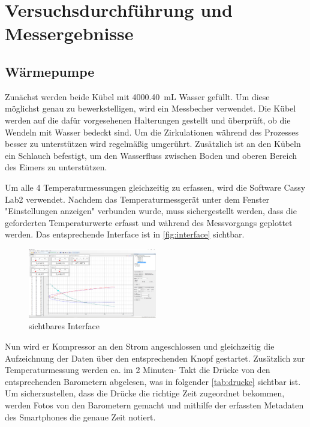 \documentclass[12pt,english,ngerman]{scrartcl}
\begin{document}
\section{Versuchsdurchführung und Messergebnisse}\label{sec:versuchsdurchfuehrung_messergebnisse}

\subsection{Wärmepumpe}

Zunächst werden beide Kübel mit \SI{4000,40}{\milli\liter} Wasser gefüllt. Um diese möglichst genau zu bewerkstelligen,
wird ein Messbecher verwendet. Die Kübel werden auf die dafür vorgesehenen Halterungen gestellt und überprüft, ob die 
Wendeln mit Wasser bedeckt sind. Um die Zirkulationen während des Prozesses besser zu unterstützen wird regelmäßig umgerührt.
Zusätzlich ist an den Kübeln ein Schlauch befestigt, um den Wasserfluss zwischen Boden und oberen Bereich des Eimers zu unterstützen.

Um alle 4 Temperaturmessungen gleichzeitig zu erfassen, wird die Software Cassy Lab2 verwendet. Nachdem das Temperaturmessgerät 
unter dem Fenster "Einstellungen anzeigen" verbunden wurde, muss sichergestellt werden, dass die geforderten Temperaturwerte
erfasst und während des Messvorgangs geplottet werden.
Das entsprechende Interface ist in \autoref{fig:interface} sichtbar.
\begin{figure}[H]
	\begin{center}
		\includegraphics[width =0.5\textwidth]{./figures/interface.PNG}
	\end{center}
	\caption{sichtbares Interface
	}\label{fig:interface}
\end{figure}

Nun wird er Kompressor an den Strom angeschlossen und gleichzeitig die Aufzeichnung der Daten über den entsprechenden Knopf 
gestartet.
Zusätzlich zur Temperaturmessung werden ca. im 2 Minuten- Takt die Drücke von den entsprechenden Barometern abgelesen,
was in folgender \autoref{tab:drucke} sichtbar ist. Um sicherzustellen, dass die Drücke die richtige Zeit zugeordnet bekommen, werden
Fotos von den Barometern gemacht und mithilfe der erfassten Metadaten des Smartphones die genaue Zeit notiert.
\end{document}
